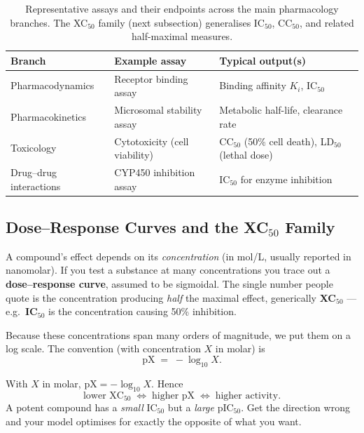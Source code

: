 \documentclass[11pt, oneside]{book}
\begin{document}
\begin{table}[H]
\centering
\small
\begin{tabular}{lll}
\toprule
\textbf{Branch} & \textbf{Example assay} & \textbf{Typical output(s)} \\
\midrule
Pharmacodynamics        & Receptor binding assay         & Binding affinity $K_i$, IC$_{50}$ \\
Pharmacokinetics        & Microsomal stability assay     & Metabolic half-life, clearance rate \\
Toxicology              & Cytotoxicity (cell viability)  & CC$_{50}$ (50\% cell death), LD$_{50}$ (lethal dose) \\
Drug--drug interactions & CYP450 inhibition assay        & IC$_{50}$ for enzyme inhibition \\
\bottomrule
\end{tabular}
\caption{Representative assays and their endpoints across the main pharmacology
branches. The XC$_{50}$ family (next subsection) generalises IC$_{50}$,
CC$_{50}$, and related half-maximal measures.}
\end{table}

\subsection{Dose--Response Curves and the \texorpdfstring{XC$_{50}$}{XC50} Family}

A compound's effect depends on its \emph{concentration} (in mol/L, usually
reported in nanomolar). If you test a substance at many concentrations you trace
out a \textbf{dose--response curve}, assumed to be sigmoidal. The single number
people quote is the concentration producing \emph{half} the maximal effect,
generically \textbf{XC$_{50}$} --- e.g.\ \textbf{IC$_{50}$} is the concentration
causing 50\% inhibition.

Because these concentrations span many orders of magnitude, we put them on a log
scale. The convention (with concentration $X$ in molar) is
\[
  \mathrm{pX} \;=\; -\log_{10} X .
\]

\begin{thmbox}[title={Activity on a log scale}]
With $X$ in molar, $\mathrm{pX} = -\log_{10} X$. Hence
\[
  \text{lower XC}_{50} \;\Longleftrightarrow\; \text{higher pX}
  \;\Longleftrightarrow\; \text{higher activity.}
\]
A potent compound has a \emph{small} IC$_{50}$ but a \emph{large} pIC$_{50}$. Get
the direction wrong and your model optimises for exactly the opposite of what you
want.
\end{thmbox}
\end{document}
